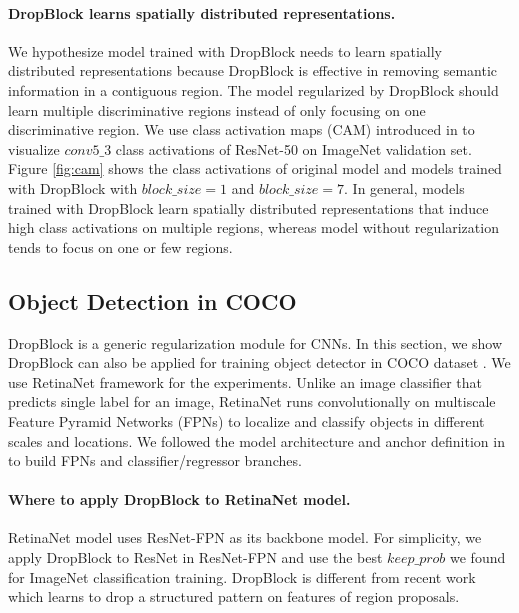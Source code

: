 \documentclass{article}
\begin{document}
\paragraph{DropBlock learns spatially distributed representations.} We hypothesize model trained with DropBlock needs to learn spatially distributed representations because DropBlock is effective in removing semantic information in a contiguous region. The model regularized by DropBlock should learn multiple discriminative regions instead of only focusing on one discriminative region. We use class activation maps (CAM) introduced in \cite{zhou2016dcam} to visualize $conv5\_3$ class activations of ResNet-50 on ImageNet validation set. Figure \ref{fig:cam} shows the class activations of original model and models trained with DropBlock with $block\_size=1$ and $block\_size=7$. In general, models trained with DropBlock learn spatially distributed representations that induce high class activations on multiple regions, whereas model without regularization tends to focus on one or few regions.


\subsection{Object Detection in COCO}
DropBlock is a generic regularization module for CNNs. In this section, we show DropBlock can also be applied for training object detector in COCO dataset \cite{lin2014coco}. We use RetinaNet \cite{lin2017focalloss} framework for the experiments. Unlike an image classifier that predicts single label for an image, RetinaNet runs convolutionally on multiscale Feature Pyramid Networks (FPNs) \cite{lin2017fpn} to localize and classify objects in different scales and locations. We followed the model architecture and anchor definition in \cite{lin2017focalloss} to build FPNs and classifier/regressor branches.

\paragraph{Where to apply DropBlock to RetinaNet model.}
RetinaNet model uses ResNet-FPN as its backbone model. For simplicity, we apply DropBlock to ResNet in ResNet-FPN and use the best $keep\_prob$ we found for ImageNet classification training. DropBlock is different from recent work \cite{afastrcnn2017} which learns to drop a structured pattern on features of region proposals.
\end{document}
